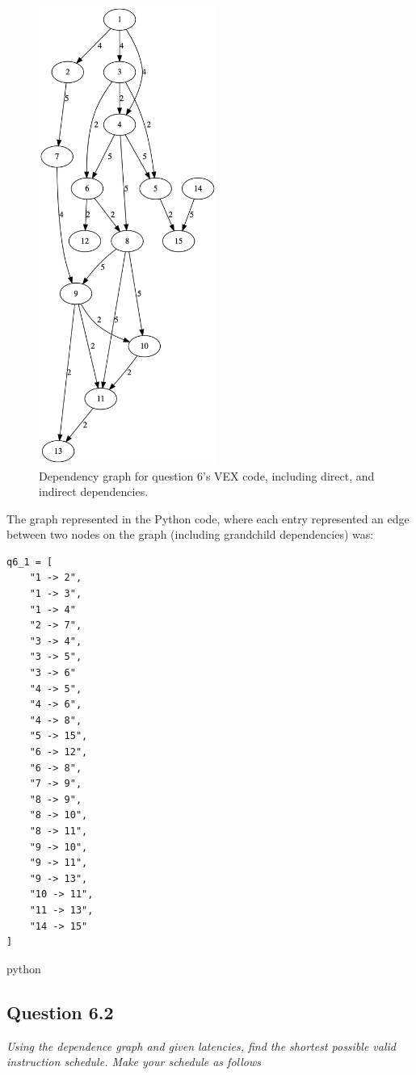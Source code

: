 \documentclass[
	letterpaper, %
]{jdf}
\begin{document}
\begin{figure}[H]
	\centering
	\includegraphics[height=15cm]{Figures/graphviz.png}
	\caption{Dependency graph for question 6's VEX code, including direct, and indirect dependencies.}
	\label{fig:flowchart}
\end{figure}

The graph represented in the Python code, where each entry represented an edge between two nodes on the graph (including grandchild dependencies) was:
\begin{verbatim}
q6_1 = [
    "1 -> 2",
    "1 -> 3",
    "1 -> 4" 
    "2 -> 7",
    "3 -> 4", 
    "3 -> 5",
    "3 -> 6"
    "4 -> 5",
    "4 -> 6", 
    "4 -> 8", 
    "5 -> 15",
    "6 -> 12",
    "6 -> 8", 
    "7 -> 9", 
    "8 -> 9", 
    "8 -> 10", 
    "8 -> 11", 
    "9 -> 10", 
    "9 -> 11", 
    "9 -> 13",
    "10 -> 11", 
    "11 -> 13", 
    "14 -> 15" 
]
\end{verbatim}{python}
\subsection{Question 6.2}
\textit{Using the dependence graph and given latencies, find the shortest possible valid instruction schedule. Make your schedule as follows}
\end{document}
